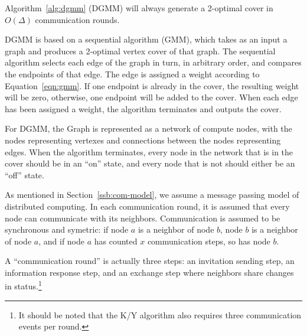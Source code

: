 \begin{thm}
  Algorithm~\ref{alg:dgmm} (DGMM) will always generate a 2-optimal cover in $O(\Delta)$ communication rounds.
\label{thm:dgmm-term}
\end{thm}
\begin{note}
\label{not:gmm-dgmm}
DGMM is based on a sequential algorithm (GMM), which takes as an input a graph and produces a 2-optimal vertex cover of that graph. The sequential algorithm selects each edge of the graph in turn, in arbitrary order, and compares the endpoints of that edge. The edge is assigned a weight according to Equation~\ref{eqn:gmm}. If one endpoint is already in the cover, the resulting weight will be zero, otherwise, one endpoint will be added to the cover. When each edge has been assigned a weight, the algorithm terminates and outputs the cover.

For DGMM, the Graph is represented as a network of compute nodes, with the nodes representing vertexes and connections between the nodes representing edges. When the algorithm terminates, every node in the network that is in the cover should be in an ``on'' state, and every node that is not should either be an ``off'' state.
\end{note}
\begin{note}
\label{not:com-model}
As mentioned in Section~\ref{ssb:com-model}, we assume a message passing model of distributed computing. In each communication round, it is assumed that every node can communicate with its neighbors. Communication is assumed to be synchronous and symetric: if node $a$ is a neighbor of node $b$, node $b$ is a neighbor of node $a$, and if node $a$ has counted $x$ communication steps, so has node $b$.

A ``communication round'' is actually three steps: an invitation sending step, an information response step, and an exchange step where neighbors share changes in status.\footnote{It should be noted that the K/Y algorithm also requires three communication events per round.} 
\end{note}
